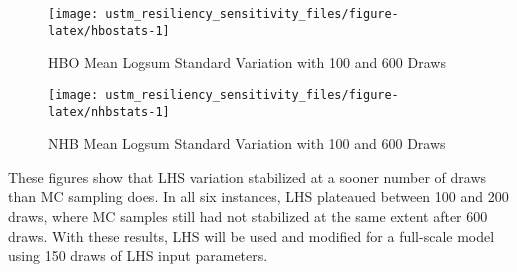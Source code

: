 \documentclass[3p, authoryear, review]{elsarticle} %
\begin{document}
\begin{figure}

{\centering \texttt{[image: ustm\_resiliency\_sensitivity\_files/figure-latex/hbostats-1]} 

}

\caption{HBO Mean Logsum Standard Variation with 100 and 600 Draws}\label{fig:hbostats}
\end{figure}

\begin{figure}

{\centering \texttt{[image: ustm\_resiliency\_sensitivity\_files/figure-latex/nhbstats-1]} 

}

\caption{NHB Mean Logsum Standard Variation with 100 and 600 Draws}\label{fig:nhbstats}
\end{figure}

These figures show that LHS variation stabilized at a sooner number of draws than MC sampling does. In all six instances, LHS plateaued between 100 and 200 draws, where MC samples still had not stabilized at the same extent after 600 draws. With these results, LHS will be used and modified for a full-scale model using 150 draws of LHS input parameters.


\end{document}

